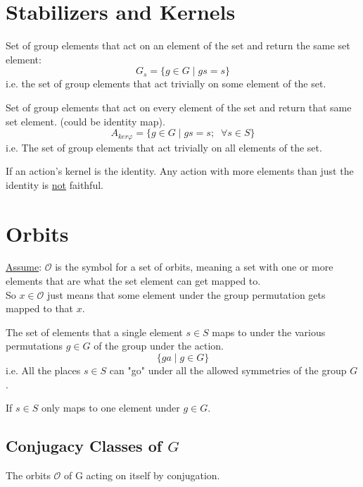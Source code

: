 \section{Stabilizers and Kernels}
\begin{defn}[Stabilizer of $s$ in $G$]
	Set of group elements that act on an element of the set and return the same set element:
	\[{G}_{s} = \{g \in G \mid g s = s\}\]
	i.e. the set of group elements that act trivially on some element of the set.
\end{defn}
\begin{defn}
	Set of group elements that act on every element of the set and return that same set element. (could be identity map).
	\[ {A}_{ker\varphi} = \{g \in G \mid g s = s;  \;\; \forall s \in S\}\]
	i.e. The set of group elements that act trivially on all elements of the set.
\end{defn}
\begin{defn}
	If an action's kernel is the identity. Any action with more elements than just the identity is \underline{not} faithful.
\end{defn}

\section{Orbits}
\underline{Assume}: $\mathcal O$ is the symbol for a set of orbits, meaning a set with one or more elements that are what the set element can get mapped to. \\ 

So $x \in \mathcal O$ just means that some element under the group permutation gets mapped to that $x$.
\begin{defn}[Orbit of $s$ in $G$]
	The set of elements that a single element $s \in S$ maps to under the various permutations $g \in G$ of the group under the action.
	\[\{ga \mid g \in G\}\]
	i.e. All the places $s \in S$ can "go" under all the allowed symmetries of the group $G$.
\end{defn}
\begin{defn}
	If $s \in S$ only maps to one element under $g \in G$.
\end{defn}

\subsection{Conjugacy Classes of $G$}
\begin{defn}
	The orbits $\mathcal O$ of G acting on itself by conjugation.
\end{defn}

